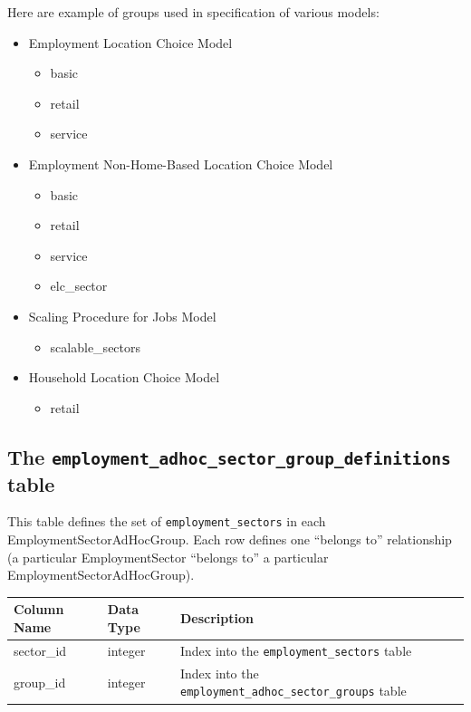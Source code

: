 Here are example of groups used in specification of various models:
\begin{itemize} \tight
\item Employment Location Choice Model \modelsindex
\begin{itemize} \tight
\item basic
\item retail
\item service

\end{itemize}
\item Employment Non-Home-Based Location Choice Model \modelsindex
\begin{itemize} \tight
\item basic
\item retail
\item service
\item elc_sector

\end{itemize}
\item Scaling Procedure for Jobs Model \modelsindex
\begin{itemize} \tight
\item scalable_sectors

\end{itemize}
\item Household Location Choice Model \modelsindex
\begin{itemize} \tight
\item retail

\end{itemize}

\end{itemize}

\subsection{The {\tt employment_adhoc_sector_group_definitions} table}

This table defines the set of \verb|employment_sectors| in each
EmploymentSectorAdHocGroup. Each row defines one ``belongs to'' relationship (a
particular EmploymentSector ``belongs to'' a particular
EmploymentSectorAdHocGroup).

\begin{tabular}{lll}
\textbf{Column Name} & \textbf{Data Type} & \textbf{Description} \\
\hline
sector_id & integer & Index into the \verb|employment_sectors| table  \\
\hline
group_id & integer & Index into the \verb|employment_adhoc_sector_groups| table  \\
\hline
\end{tabular}

